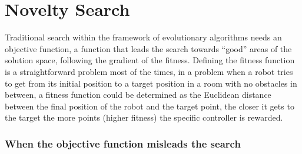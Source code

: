\section{Novelty Search}

Traditional search within the framework of evolutionary algorithms needs an objective function, a function that leads the search towards ``good'' areas of the solution space, following the gradient of the fitness. Defining the fitness function is a straightforward problem most of the times, in a problem when a robot tries to get from its initial position to a target position in a room with no obstacles in between, a fitness function could be determined as the Euclidean distance between the final position of the robot and the target point, the closer it gets to the target the more points (higher fitness) the specific controller is rewarded.

\subsubsection*{When the objective function misleads the search}

